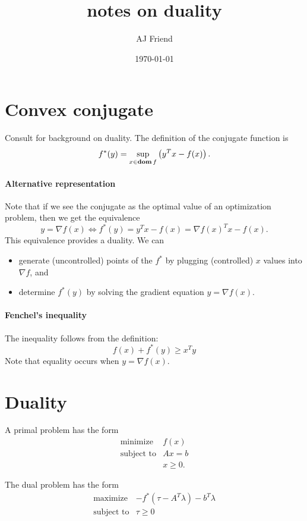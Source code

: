 \documentclass{article}
\title{notes on duality}
\author{AJ Friend}
\date{\today}
\begin{document}
\maketitle

\section{Convex conjugate}
Consult \cite{boyd2009convex} for background on duality.
The definition of the conjugate function is
\[
f^*(y) = \sup_{x \in \mathop{\bf dom} f} \left( y^T x - f(x) \right).
\]

\paragraph{Alternative representation}
Note that if we see the conjugate as the optimal value of an optimization
problem, then we get the equivalence
\[
y = \nabla f(x) \iff f^*(y) = y^T x - f(x) = \nabla f(x)^T x - f(x).
\]
This equivalence provides a duality.
We can
\begin{itemize}
\item generate (uncontrolled) points of the $f^*$ by plugging (controlled) $x$
values into $\nabla f$, and
\item determine $f^*(y)$ by solving the gradient equation $y = \nabla f(x)$.
\end{itemize}

\paragraph{Fenchel’s inequality} The inequality follows from the definition:
\[
f(x) + f^*(y) \geq x^T y
\]
Note that equality occurs when $y = \nabla f(x)$.

\section{Duality}
A primal problem has the form
\[
\begin{array}{ll}
\mbox{minimize} & f(x)\\
\mbox{subject to} & Ax = b\\
& x \geq 0.
\end{array}
\]

The dual problem has the form
\[
\begin{array}{ll}
\mbox{maximize} & -f^*(\tau - A^T \lambda) - b^T \lambda \\
\mbox{subject to} & \tau \geq 0
\end{array}
\]
\end{document}
